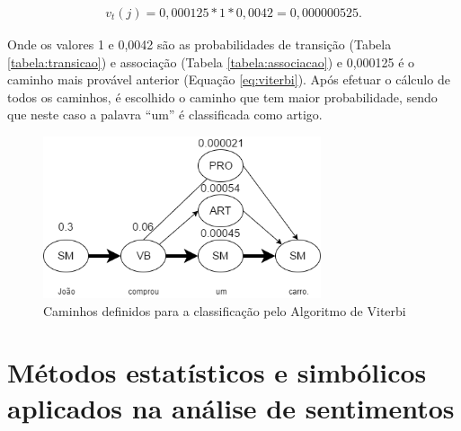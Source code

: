 \begin{equation}
\begin{split}
v_t(j) = 0,000125 * 1 * 0,0042 = 0,000000525.
\end{split}
\label{eq:comprou}
\end{equation}

Onde os valores 1 e 0,0042 são as probabilidades de transição (Tabela
\ref{tabela:transicao}) e associação (Tabela \ref{tabela:associacao}) e
0,000125 é o caminho mais provável anterior (Equação \ref{eq:viterbi}).
Após efetuar o cálculo de todos os caminhos, é escolhido o caminho que tem maior
probabilidade, sendo que neste caso a palavra ``um'' é classificada como
artigo.

\begin{figure}[htbp]
\centering
\includegraphics[height=180px]{imagens/markov2.png}
\caption{Caminhos definidos para a classificação pelo Algoritmo de Viterbi}
\label{fig:markov2}
\end{figure}


%
%
%

\chapter{Métodos estatísticos e simbólicos aplicados na análise de sentimentos}
\label{cap:Classificadores}

